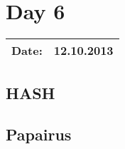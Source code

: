 \section{Day 6}
\begin{tabular}{|c|c|}
\hline
Date: & 12.10.2013 \\
\hline
\end{tabular}
\subsection{HASH}
\subsection{Papairus}

